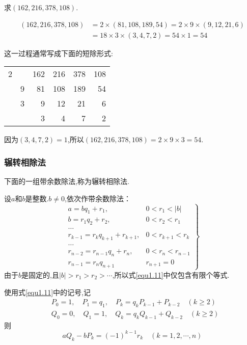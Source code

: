 \example 求$(162,216,378,108)$.

\solve \begin{equation*}
	\begin{aligned}
		(162,216,378,108) &=2 \times(81,108,189,54)=2 \times 9 \times(9,12,21,6) \\
		&=18 \times 3 \times(3,4,7,2)=54 \times 1=54
	\end{aligned}
\end{equation*}

这一过程通常写成下面的短除形式:

\begin{table}[htb]
	\centering
	\begin{tabular}{rrrrrr}
		\multicolumn{1}{l|}{2} &                        & 162 & 216 & 378 & 108 \\ \cline{2-6} 
		& \multicolumn{1}{l|}{9} & 81 & 108 & 189 & 54 \\ \cline{3-6} 
		& \multicolumn{1}{l|}{3} & 9 & 12  & 21 & 6 \\ \cline{3-6}
		&                        & 3 & 4  & 7 & 2
	\end{tabular}
\end{table}

因为$(3,4,7,2)=1$,所以$(162,216,378,108)=2 \times 9 \times 3=54$.

\subsubsection{辗转相除法}

 下面的一组带余数除法,称为辗转相除法.

设$a$和$b$是整数.$b\neq 0$,依次作带余数除法：
\begin{equation}\label{equ1.11}
	\left.\begin{array}{ll}
		a=b q_{1}+r_{1}, & 0<r_{1}<|b| \\
		b=r_{1} q_{2}+r_{2}, & 0<r_{2}<r_{1} \\
		\ldots \\
		r_{k-1}=r_{k} q_{k+1}+r_{k+1}, & 0<r_{k+1}<r_{k} \\
		\ldots \\
		r_{n-2}=r_{n-1} q_{n}+r_{n}, & 0<r_{n}<r_{n-1} \\
		r_{n-1}=r_{n} q_{n+1} & r_{n+1}=0
	\end{array}\right\}
\end{equation}
由于$b$是固定的,且$|b|>r_{1}>r_{2}>\cdots$,所以式\eqref{equ1.11}中仅包含有限个等式.

\theorem \label{Thm1.5.1}使用式\eqref{equ1.11}中的记号,记
\begin{equation*}
	\begin{split}
		&P_{0}=1, \quad P_{1}=q_{1}, \quad P_{k}=q_{k} P_{k-1}+P_{k-2}\quad (k \geqslant 2) \\
		&Q_{0}=0, \quad Q_{1}=1, \quad Q_{k}=q_{k} Q_{k-1}+Q_{k-2} \quad (k \geqslant 2)
	\end{split}
\end{equation*}
则
\begin{equation}\label{equ1.12}
	a Q_{k}-b P_{k}=(-1)^{k-1} r_{k} \quad(k=1,2, \cdots, n)
\end{equation}

